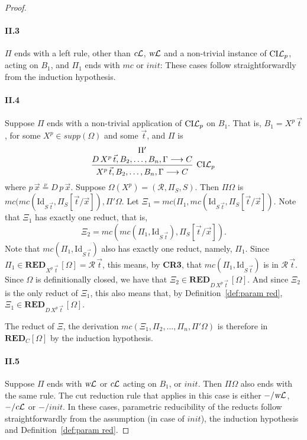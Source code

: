 \documentclass[preprint]{elsarticle}
\def\Rscr{{\mathcal R}}
\newcommand{\Seq}[2]{#1\longrightarrow #2}
\newcommand{\cL}{\hbox{\sl c}{\cal L}}
\newcommand{\defnu}{\stackrel{\nu}{=}}
\newcommand{\coindLP}{{\rm CI}{\cal L}_p}
\newcommand{\wL}{\hbox{\sl w}{\cal L}}
\def\RED{{\mathbf{RED}}}
\def\idrv{{\mathrm{Id}}}
\begin{document}
\begin{proof}
\begin{trivlist}
\end{trivlist}

\paragraph{\bf II.3} $\Pi$ ends with a left rule, other than $\cL$,
$\wL$ and a non-trivial instance of $\coindLP$, acting on $B_1$, and
$\Pi_1$ ends with $mc$ or $init$: These cases follow straightforwardly
from the induction hypothesis.



\paragraph{\bf II.4} Suppose $\Pi$ ends with a non-trivial application
of $\coindLP$ on $B_1$. That is, $B_1 = X^p\,\vec t$, for some $X^p
\in supp(\Omega)$ and some $\vec t$, and $\Pi$ is
$$
\infer[\coindLP] {\Seq{X^p\,\vec t, B_2, \ldots, B_n, \Gamma}{C}} {
  \deduce{\Seq{D\,X^p\,\vec t, B_2,\ldots, B_n, \Gamma}{C}}{\Pi'} }
$$
where $p\,\vec x \defnu D\,p\,\vec x$.  Suppose $\Omega(X^p) = (\Rscr,
\Pi_S, S)$.  Then $\Pi\Omega$ is
$mc(mc(\idrv_{S\,\vec t}, \Pi_S[\vec t/\vec x]), \Pi'\Omega$.
Let $\Xi_1 = mc(\Pi_1, mc(\idrv_{S\,\vec t}, \Pi_S[\vec t/\vec x])$.
Note that $\Xi_1$ has exactly one reduct, that is,
$$
\Xi_2 = mc(mc(\Pi_1,\idrv_{S\,\vec t}), \Pi_S[\vec t/\vec x]).
$$
Note that $mc(\Pi_1,\idrv_{S\,\vec t})$ also has exactly one reduct,
namely, $\Pi_1$. Since $\Pi_1\in \RED_{X^p\,\vec t}\, [\Omega] =
\Rscr\,\vec t$, this means, by {\bf CR3}, that $mc(\Pi_1,\idrv_{S\,\vec t})$ is in
$\Rscr\,\vec t$.  Since $\Omega$ is definitionally closed, we have
that $\Xi_2 \in \RED_{D\,X^p\,\vec t}\, [\Omega]$.  And since $\Xi_2$ is
the only reduct of $\Xi_1$, this also means that, by
Definition~\ref{def:param red}, $\Xi_1 \in \RED_{D\,X^p\,\vec
  t}\, [\Omega]$.

The reduct of $\Xi$, \ie the derivation $mc(\Xi_1,\Pi_2,\ldots,\Pi_n,\Pi'\Omega)$
is therefore in $\RED_C[\Omega]$ by the induction hypothesis.

\paragraph{\bf II.5} Suppose $\Pi$ ends with $\wL$ or $\cL$ acting on
$B_1$, or $init$. Then $\Pi\Omega$ also ends with the same rule.  The
cut reduction rule that applies in this case is either $-/\wL$,
$-/\cL$ or $-/init$. In these cases, parametric reducibility of the
reducts follow straightforwardly from the assumption (in case of
$init$), the induction hypothesis and Definition~\ref{def:param red}.



\end{proof}
\end{document}
